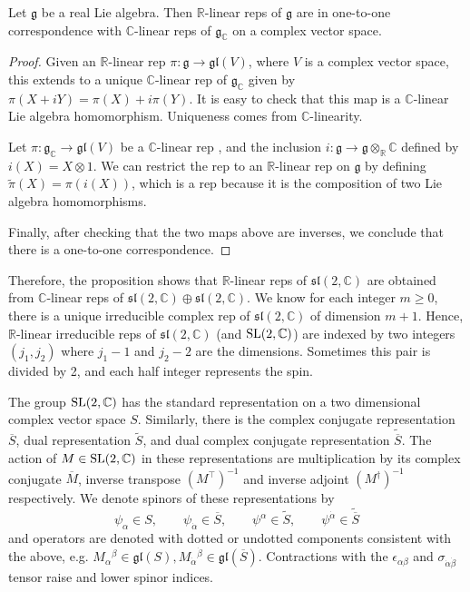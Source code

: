 \begin{prop}
	Let $\mathfrak{g}$ be a real Lie algebra. Then
	$\mathbb{R}$-linear reps of $\mathfrak{g}$ are in one-to-one
	correspondence with $\mathbb{C}$-linear reps of  $\mathfrak{g}_{\mathbb{C}}$
	on a complex vector space. 
\end{prop}
\begin{proof}
	Given an $\mathbb{R}$-linear rep $\pi : \mathfrak{g} \to \mathfrak{gl}(V)$,
	where  $V$ is a complex vector space, this extends to a unique
	$\mathbb{C}$-linear rep of $\mathfrak{g}_{\mathbb{C}}$ given by 
	$\pi(X+iY) = \pi(X) + i\pi(Y)$. It is easy to check that this map is  a
	$\mathbb{C}$-linear Lie algebra homomorphism. Uniqueness comes from
	$\mathbb{C}$-linearity.

	Let $\pi : \mathfrak{g}_{\mathbb{C}} \to\mathfrak{gl}(V)$ be a 
	$\mathbb{C}$-linear rep , and the inclusion $i : \mathfrak{g} \to
	\mathfrak{g}\otimes_{\mathbb{R}}\mathbb{C}$ defined by $i(X) = X\otimes 1$. We can restrict
	the rep to an $\mathbb{R}$-linear rep on $\mathfrak{g}$ by defining
	$\widetilde{\pi}(X) = \pi(i(X))$, which is a rep because it is the composition of
	two Lie algebra homomorphisms. 

	Finally, after checking that the two maps above are inverses, we conclude
	that there is a one-to-one correspondence. 
\end{proof}

Therefore, the proposition shows that $\mathbb{R}$-linear reps of
$\mathfrak{sl}(2,\mathbb{C})$ are obtained from $\mathbb{C}$-linear reps of
$\mathfrak{sl}(2,\mathbb{C})\oplus \mathfrak{sl}(2,\mathbb{C})$.
We know for each integer $m\geq 0$, there is a unique irreducible complex
rep of  $\mathfrak{sl}(2,\mathbb{C})$ of dimension $m+1$.\cite{hall} Hence,
$\mathbb{R}$-linear irreducible reps  of $\mathfrak{sl}(2,\mathbb{C})$ (and
$\operatorname{SL}(2,\mathbb{C})$)
are indexed by two integers $(j_1,j_2)$ where $j_1-1$ and $j_2-2$ are the
dimensions. Sometimes this pair is divided by 2, and each half integer
represents the spin. 

The group $\operatorname{SL}(2,\mathbb{C})$ has the standard representation on a two dimensional
complex vector space $S$. Similarly, there is the complex conjugate
representation $\overline{S}$, dual representation $\widetilde{S}$, and dual
complex conjugate representation $\widetilde{\overline{S}}$. 
The action of $M\in \operatorname{SL}(2,\mathbb{C})$ in these representations are
multiplication by its complex conjugate $\overline{M}$, inverse transpose
$(M^\intercal)^{-1}$ and inverse adjoint $(M^{\dagger})^{-1}$ respectively.
We denote spinors of these representations by 
\[
\psi_\alpha \in S, \qquad \psi_{\dot{\alpha}}\in \overline{S}, \qquad
\psi^\alpha \in \widetilde{S}, \qquad \psi^{\dot{\alpha}}\in \widetilde{\overline{S}}
\] 
and operators are denoted with dotted or undotted components consistent with the
above, e.g. $M_{\alpha}{}^\beta \in \mathfrak{gl}(S),
M_{\dot{\alpha}}{}^{\dot{\beta}} \in \mathfrak{gl}(\overline{S})$. 
Contractions with the $\epsilon_{\alpha\beta}$ and 
$\sigma_{\dot{\alpha}\dot{\beta}}$ tensor raise and lower spinor indices.

